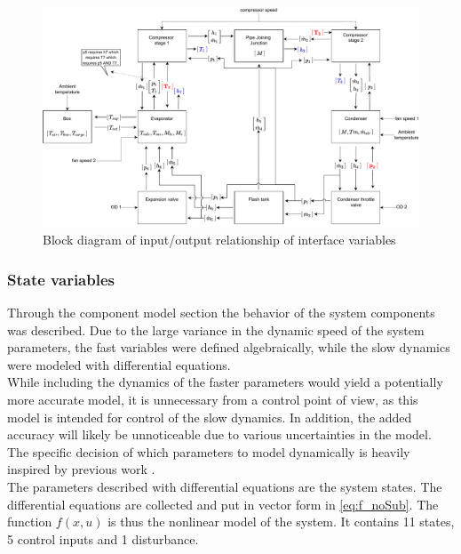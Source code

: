 \begin{figure}[h!]
	\centering
	\includegraphics[width=1\textwidth]{Graphics/Block_Diagram_inout.pdf}
	\caption{Block diagram of input/output relationship of interface variables}
	\label{fig:Block_diagram_inout}
\end{figure}


\subsubsection{State variables}

Through the component model section the behavior of the system components was described. Due to the large variance in the dynamic speed of the system parameters, the fast variables were defined algebraically, while the slow dynamics were modeled with differential equations. \\
While including the dynamics of the faster parameters would yield a potentially more accurate model, it is unnecessary from a control point of view, as this model is intended for control of the slow dynamics. In addition, the added accuracy will likely be unnoticeable due to various uncertainties in the model. The specific decision of which parameters to model dynamically is heavily inspired by previous work \cite{Sorensen2013}.\\
The parameters described with differential equations are the system states. The differential equations are collected and put in vector form in \cref{eq:f_noSub}. The function $f(x,u)$ is thus the nonlinear model of the system. It contains 11 states, 5 control inputs and 1 disturbance.




